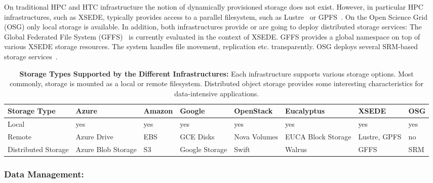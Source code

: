 \documentclass[times]{cpeauth}
\begin{document}
On traditional HPC and HTC infrastructure the notion of dynamically
provisioned storage does not exist. However, in particular HPC
infrastructures, such as XSEDE, typically provides access to a parallel
filesystem, such as Lustre~\cite{lustre} or
GPFS~\cite{Schmuck:2002:GSF:1083323.1083349}. On the Open Science Grid (OSG)
only local storage is available. In addition, both infrastructures provide or
are going to deploy distributed storage services: The Global Federated File
System (GFFS)~\cite{gffs} is currently evaluated in the context of XSEDE. GFFS
provides a global namespace on top of various XSEDE storage resources. The
system handles file movement, replication etc. transparently. OSG deploys 
several SRM-based storage services~\cite{srm-ogf}.



\begin{table}[t]
\centering
\begin{tabular}{|p{1.7cm}|p{1.3cm}|p{1.3cm}|p{1.3cm}|p{1.4cm}|p{1.4cm}|p{1.3cm}|p{1.2cm}|}
	\hline
	\textbf{Storage Type} &\textbf{Azure} &\textbf{Amazon} &\textbf{Google} &\textbf{Open\-Stack} &\textbf{Euca\-lyptus} &\textbf{XSEDE}  &\textbf{OSG} \\
	\hline
	Local	&yes &yes &yes &yes &yes &yes &yes\\
	\hline
	Remote &Azure Drive &EBS &GCE Disks &Nova Volumes &EUCA Block Storage &Lustre, GPFS 
	&no\\
	\hline
	Distributed Storage &Azure Blob Storage &S3 &Google Storage &Swift & Walrus &GFFS
	 &SRM\\
	\hline	
\end{tabular}
\caption{\textbf{Storage Types Supported by the Different Infrastructures:} 
Each infrastructure supports various storage options. Most commonly, storage 
is mounted as a local or remote filesystem. Distributed object storage 
provides some interesting characteristics for data-intensive applications. 
\label{tab:storage-systems}}
\end{table}

\subsubsection*{Data Management:}

\end{document}
